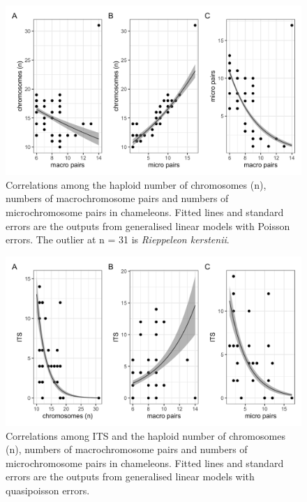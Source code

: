 \documentclass[a4paper, 12pt]{article}
\begin{document}
\begin{figure}[H]
 \centering
  \includegraphics[width = \linewidth]{figures/micro-macro-chromosomes.png}
  \caption{Correlations among the haploid number of chromosomes (n), numbers of macrochromosome pairs and numbers of microchromosome pairs in chameleons. Fitted lines and standard errors are the outputs from generalised linear models with Poisson errors. The outlier at n = 31 is \textit{Rieppeleon kerstenii}.
}
  \label{fig-otus-macro}
\end{figure} 


\newpage
\begin{figure}[H]
 \centering
  \includegraphics[width = \linewidth]{figures/ITS-chromosomes.png}
  \caption{Correlations among ITS and the haploid number of chromosomes (n), numbers of macrochromosome pairs and numbers of microchromosome pairs in chameleons. Fitted lines and standard errors are the outputs from generalised linear models with quasipoisson errors.
}
  \label{fig-otus-its}
\end{figure} 
\end{document}
